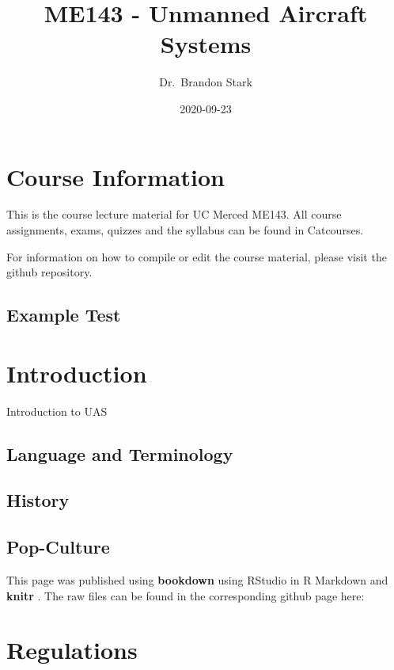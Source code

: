 \documentclass[
]{book}
\title{ME143 - Unmanned Aircraft Systems}
\author{Dr.~Brandon Stark}
\date{2020-09-23}
\begin{document}
\maketitle

{
\setcounter{tocdepth}{1}
\tableofcontents
}
\hypertarget{course-information}{%
\chapter{Course Information}\label{course-information}}

This is the course lecture material for UC Merced ME143. All course assignments, exams, quizzes and the syllabus can be found in Catcourses.

For information on how to compile or edit the course material, please visit the github repository.

\hypertarget{example-test}{%
\section{Example Test}\label{example-test}}

\hypertarget{ch-intro}{%
\chapter{Introduction}\label{ch-intro}}

Introduction to UAS

\hypertarget{language-and-terminology}{%
\section{Language and Terminology}\label{language-and-terminology}}

\hypertarget{history}{%
\section{History}\label{history}}

\hypertarget{pop-culture}{%
\section{Pop-Culture}\label{pop-culture}}

This page was published using \textbf{bookdown}\citep{R-bookdown} using RStudio in R Markdown and \textbf{knitr} \citep{xie2015}. The raw files can be found in the corresponding github page here:

\hypertarget{regulations}{%
\chapter{Regulations}\label{regulations}}
\end{document}
